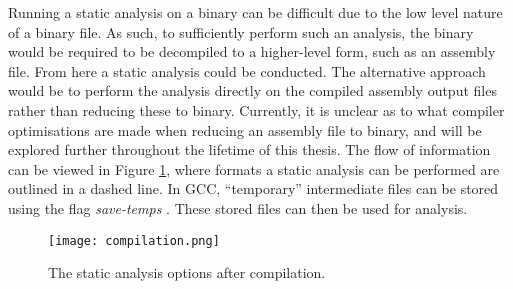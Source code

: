 Running a static analysis on a binary can be difficult due to the low level nature of a binary file. As such, to sufficiently perform such an analysis, the binary would be required to be decompiled to a higher-level form, such as an assembly file. From here a static analysis could be conducted. The alternative approach would be to perform the analysis directly on the compiled assembly output files rather than reducing these to binary. Currently, it is unclear as to what compiler optimisations are made when reducing an assembly file to binary, and will be explored further throughout the lifetime of this thesis. The flow of information can be viewed in Figure \ref{fig:analysis}, where formats a static analysis can be performed are outlined in a dashed line. In GCC, ``temporary'' intermediate files can be stored using the flag \textit{save-temps} \cite{gccdevoptions}. These stored files can then be used for analysis.


\begin{figure}
    \centering
    \texttt{[image: compilation.png]}
    \caption{The static analysis options after compilation.}
    \label{fig:analysis}
\end{figure}



